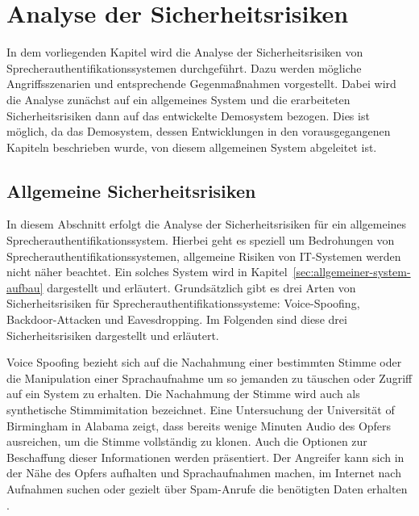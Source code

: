 \section{Analyse der Sicherheitsrisiken}\label{sec:Sicherheitsrisiken}

\textauthor{\vJB,}{\vLB}{}

In dem vorliegenden Kapitel wird die Analyse der Sicherheitsrisiken von Sprecherauthentifikationssystemen durchgeführt.
Dazu werden mögliche Angriffsszenarien und entsprechende Gegenmaßnahmen vorgestellt.
Dabei wird die Analyse zunächst auf ein allgemeines System und die erarbeiteten Sicherheitsrisiken dann auf das entwickelte Demosystem bezogen.
Dies ist möglich, da das Demosystem, dessen Entwicklungen in den vorausgegangenen Kapiteln beschrieben wurde, von diesem allgemeinen System abgeleitet ist.

\subsection{Allgemeine Sicherheitsrisiken}

\textauthor{\vLB}{}{}

In diesem Abschnitt erfolgt die Analyse der Sicherheitsrisiken für ein allgemeines Sprecherauthentifikationssystem.
Hierbei geht es speziell um Bedrohungen von Sprecherauthentifikationssystemen, allgemeine Risiken von IT-Systemen werden nicht näher beachtet.
Ein solches System wird in Kapitel~\ref{sec:allgemeiner-system-aufbau} dargestellt und erläutert.
Grundsätzlich gibt es drei Arten von Sicherheitsrisiken für Sprecherauthentifikationssysteme: Voice-Spoofing, Backdoor-Attacken und Eavesdropping.
Im Folgenden sind diese drei Sicherheitsrisiken dargestellt und erläutert.

Voice Spoofing bezieht sich auf die Nachahmung einer bestimmten Stimme oder die Manipulation einer Sprachaufnahme um so jemanden zu täuschen oder Zugriff auf ein System zu erhalten.
Die Nachahmung der Stimme wird auch als synthetische Stimmimitation bezeichnet.
Eine Untersuchung der Universität of Birmingham in Alabama zeigt, dass bereits wenige Minuten Audio des Opfers ausreichen, um die Stimme vollständig zu klonen.
Auch die Optionen zur Beschaffung dieser Informationen werden präsentiert.
Der Angreifer kann sich in der Nähe des Opfers aufhalten und Sprachaufnahmen machen, im Internet nach Aufnahmen suchen oder gezielt über Spam-Anrufe die benötigten Daten erhalten \autocite[vgl.][]{katherine_shonesy_uab_2015}.

